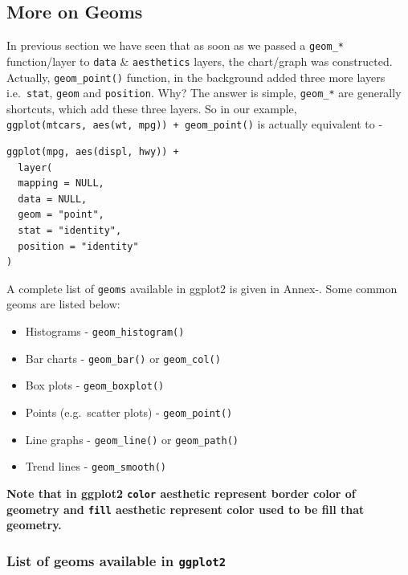 \documentclass[
]{book}
\providecommand{\tightlist}{%
  \setlength{\itemsep}{0pt}\setlength{\parskip}{0pt}}
\begin{document}
\hypertarget{geoms}{%
\subsection{More on Geoms}\label{geoms}}

In previous section we have seen that as soon as we passed a \texttt{geom\_*} function/layer to \texttt{data} \& \texttt{aesthetics} layers, the chart/graph was constructed. Actually, \texttt{geom\_point()} function, in the background added three more layers i.e.~\texttt{stat}, \texttt{geom} and \texttt{position}. Why? The answer is simple, \texttt{geom\_*} are generally shortcuts, which add these three layers. So in our example, \texttt{ggplot(mtcars,\ aes(wt,\ mpg))\ +\ geom\_point()} is actually equivalent to -

\begin{verbatim}
ggplot(mpg, aes(displ, hwy)) +
  layer(
  mapping = NULL, 
  data = NULL,
  geom = "point", 
  stat = "identity",
  position = "identity"
)
\end{verbatim}

A complete list of \texttt{geoms} available in ggplot2 is given in Annex-. Some common geoms are listed below:

\begin{itemize}
\tightlist
\item
  Histograms - \texttt{geom\_histogram()}
\item
  Bar charts - \texttt{geom\_bar()} or \texttt{geom\_col()}
\item
  Box plots - \texttt{geom\_boxplot()}
\item
  Points (e.g.~scatter plots) - \texttt{geom\_point()}
\item
  Line graphs - \texttt{geom\_line()} or \texttt{geom\_path()}
\item
  Trend lines - \texttt{geom\_smooth()}
\end{itemize}

\textbf{Note that in ggplot2 \texttt{color} aesthetic represent border color of geometry and \texttt{fill} aesthetic represent color used to be fill that geometry.}

\hypertarget{list-of-geoms-available-in-ggplot2}{%
\subsubsection{\texorpdfstring{List of geoms available in \texttt{ggplot2}}{List of geoms available in ggplot2}}\label{list-of-geoms-available-in-ggplot2}}
\end{document}
